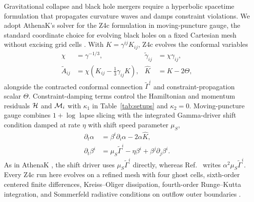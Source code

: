 Gravitational collapse and black hole mergers require a hyperbolic spacetime formulation that propagates curvature waves and damps constraint violations. We adopt AthenaK's solver \cite{2026ApJS..283...27S,Zhu:2024utz} for the Z4c formulation \cite{Bona:2003fj,Gundlach:2005eh,Hilditch:2012fp} in moving-puncture gauge, the standard coordinate choice for evolving black holes on a fixed Cartesian mesh without excising grid cells \cite{Campanelli:2005dd,Baker:2005vv,Alcubierre:2002kk,vanMeter:2006vi}. With $K = \gamma^{ij}K_{ij}$, Z4c evolves the conformal variables
\begin{align}\label{eq:z4c_vars}
\chi &= \gamma^{-1/3}, &
\tilde{\gamma}_{ij} &= \chi\gamma_{ij}, \nonumber\\
\tilde{A}_{ij} &= \chi\!\left(K_{ij} - \frac{1}{3}\gamma_{ij}K\right), &
\hat{K} &= K - 2\Theta,
\end{align}
alongside the contracted conformal connection $\tilde{\Gamma}^i$ and constraint-propagation scalar $\Theta$. Constraint-damping terms control the Hamiltonian and momentum residuals $\mathcal{H}$ and $\mathcal{M}_i$ with $\kappa_1$ in Table~\ref{tab:setups} and $\kappa_2 = 0$. Moving-puncture gauge combines $1+\log$ lapse slicing \cite{Bona:1994dr,Alcubierre:2002kk} with the integrated Gamma-driver shift condition \cite{Alcubierre:2002kk,Campanelli:2005dd,Baker:2005vv} damped at rate $\eta$ with shift speed parameter $\mu_S$,
\begin{align}\label{eq:puncture_gauge}
\partial_t \alpha &= \beta^i \partial_i \alpha - 2\alpha \hat{K}, \nonumber\\
\partial_t \beta^i &= \mu_S \tilde{\Gamma}^i - \eta \beta^i + \beta^j \partial_j \beta^i.
\end{align}
As in AthenaK \cite{Zhu:2024utz}, the shift driver uses $\mu_S \tilde{\Gamma}^i$ directly, whereas Ref.~\cite{Wu:2026nrpic} writes $\alpha^2 \mu_S \tilde{\Gamma}^i$. Every Z4c run here evolves on a refined mesh with four ghost cells, sixth-order centered finite differences, Kreiss--Oliger dissipation, fourth-order Runge--Kutta integration, and Sommerfeld radiative conditions on outflow outer boundaries \cite{Zhu:2024utz}.

